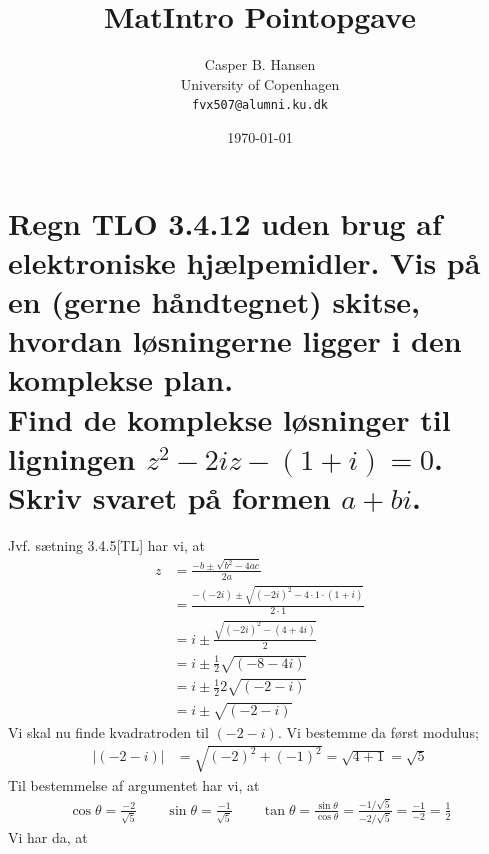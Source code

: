 \documentclass[11pt,a4paper]{article}
\title{MatIntro Pointopgave \assignmentnumber}
\author
{
    Casper B. Hansen\\
    University of Copenhagen\\
    {\tt fvx507@alumni.ku.dk}
}
\date{\today}
\newcommand{\modulus}[1]{\lvert#1\rvert}
\begin{document}


\section
{
    \mdseries
    Regn TLO 3.4.12 uden brug af elektroniske hjælpemidler. Vis på en (gerne
    håndtegnet) skitse, hvordan løsningerne ligger i den komplekse plan.
    \\\indent
    Find de komplekse løsninger til ligningen $z^2 - 2iz - (1 + i) = 0$.
    Skriv svaret på formen $a + bi$.
}
Jvf. sætning 3.4.5[TL] har vi, at
\begin{align}
    z &= \frac{-b \pm \sqrt{b^2 - 4ac}}{2a} \\
      &= \frac{-(-2i) \pm \sqrt{(-2i)^2 - 4 \cdot 1 \cdot (1 + i)}}{2 \cdot 1} \\
      &= i \pm \frac{\sqrt{(-2i)^2 - (4 + 4i)}}{2} \\
      &= i \pm \frac{1}{2} \sqrt{(-8 - 4i)} \\
      &= i \pm \frac{1}{2} 2 \sqrt{(-2 - i)} \\
      &= i \pm \sqrt{(-2 - i)}
\end{align}
Vi skal nu finde kvadratroden til $(-2 - i)$. Vi bestemme da først modulus;
\begin{align}
    \modulus{(-2 - i)} &= \sqrt{(-2)^2 + (-1)^2}
                        = \sqrt{4 + 1}
                        = \sqrt{5}
\end{align}
Til bestemmelse af argumentet har vi, at
\begin{align}
    \cos \theta = \frac{-2}{\sqrt{5}}
    \qquad
    \sin \theta = \frac{-1}{\sqrt{5}}
    \qquad
    \tan \theta = \frac{\sin \theta}{\cos \theta}
                = \frac{-1 / \sqrt{5}}{-2 / \sqrt{5}}
                = \frac{-1}{-2}
                = \frac{1}{2}
\end{align}
Vi har da, at
\end{document}
